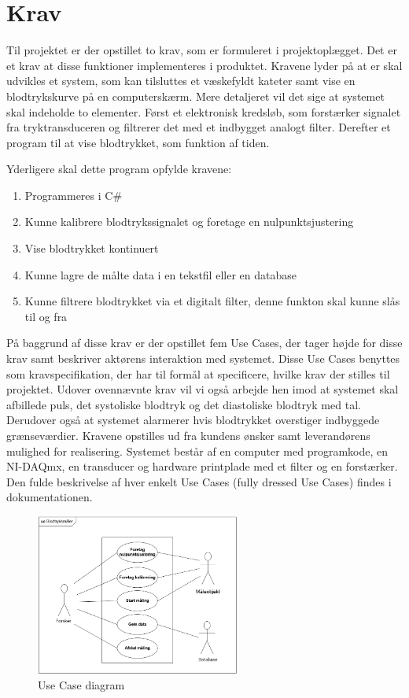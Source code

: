 \chapter{Krav}
Til projektet er der opstillet to krav, som er formuleret i projektoplægget. Det er et krav at disse funktioner implementeres i produktet. Kravene lyder på at er skal udvikles et system, som kan tilsluttes et væskefyldt kateter samt vise en blodtrykskurve på en computerskærm. Mere detaljeret vil det sige at systemet skal indeholde to elementer. Først et elektronisk kredsløb, som forstærker signalet fra tryktransduceren og filtrerer det med et indbygget analogt filter. Derefter et program til at vise blodtrykket, som funktion af tiden.

Yderligere skal dette program opfylde kravene:
\begin{enumerate}
\item Programmeres i C\#
\item Kunne kalibrere blodtrykssignalet og foretage en nulpunktsjustering
\item Vise blodtrykket kontinuert
\item Kunne lagre de målte data i en tekstfil eller en database
\item Kunne filtrere blodtrykket via et digitalt filter, denne funkton skal kunne slås til og fra
\end{enumerate}

På baggrund af disse krav er der opstillet fem Use Cases, der tager højde for disse krav samt beskriver aktørens interaktion med systemet. Disse Use Cases benyttes som kravspecifikation, der har til formål at specificere, hvilke krav der stilles til projektet. Udover ovennævnte krav vil vi også arbejde hen imod at systemet skal afbillede puls, det systoliske blodtryk og det diastoliske blodtryk med tal. Derudover også at systemet alarmerer hvis blodtrykket overstiger indbyggede grænseværdier.
Kravene opstilles ud fra kundens ønsker samt leverandørens mulighed for realisering. Systemet består af en computer med programkode, en NI-DAQmx, en transducer og hardware printplade med et filter og en forstærker. Den fulde beskrivelse af hver enkelt Use Cases (fully dressed Use Cases) findes i dokumentationen. 

\begin{figure}[htb]
	\centering
	\includegraphics[width=0.6\textwidth]{Figurer/UseCasediagram}
	\caption{Use Case diagram}
\end{figure}

